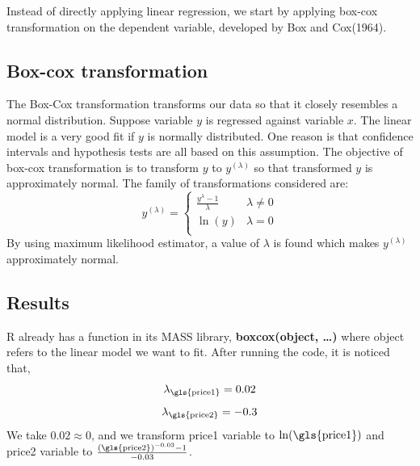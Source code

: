 \documentclass[12pt]{article}
\begin{document}
Instead of directly applying linear regression, we start by applying box-cox transformation on the dependent variable, developed by Box and Cox(1964).

\subsection{Box-cox transformation}
\label{boxcox}
The Box-Cox transformation transforms our data so that it closely resembles a normal distribution. Suppose variable $y$ is regressed against variable $x$. The linear model is a very good fit if $y$ is normally distributed. One reason is that confidence intervals and hypothesis tests are all based on this assumption. The objective of box-cox transformation is to transform $y$ to $y^{(\lambda)}$ so that transformed $y$ is approximately normal. The family of transformations considered are:
$$  y^{(\lambda)}=\left\{\begin{array}{ll}
      \frac{y^{\lambda}-1}{\lambda} & \lambda\neq 0 \\
      \ln (y) & \lambda=0 \\
\end{array} \right.$$
By using maximum likelihood estimator, a value of $\lambda$ is found which makes $y^{(\lambda)}$ approximately normal.

\subsection{Results}
R already has a function in its MASS library, \textbf{boxcox(object, …)} where object refers to the linear model we want to fit. After running the code, it is noticed that, 
$$\lambda_{\textrm{\gls{price1}}}=0.02$$
$$\lambda_{\textrm{\gls{price2}}}=-0.3$$
We take $0.02 \approx 0$, and we transform \gls{price1} variable to $\ln(\textrm{\gls{price1})}$ and \gls{price2} variable to $\frac{(\textrm{\gls{price2}})^{-0.03}-1}{-0.03}$.\\
\end{document}
